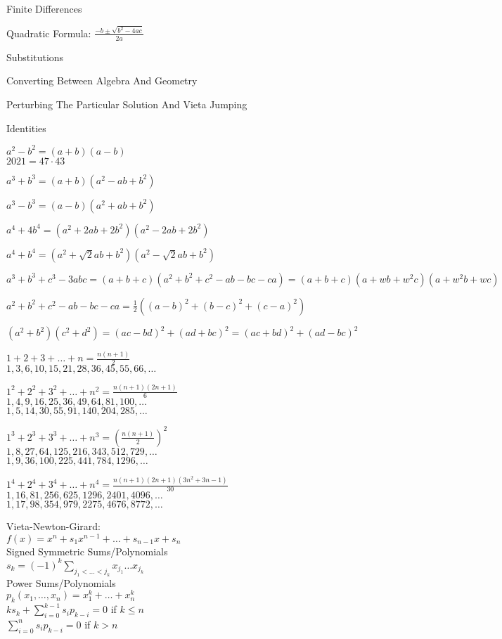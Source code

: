 Finite Differences

Quadratic Formula: $\frac{-b \pm \sqrt{b^2-4ac}}{2a}$

Substitutions

Converting Between Algebra And Geometry

Perturbing The Particular Solution And Vieta Jumping

Identities

$a^2-b^2=(a+b)(a-b)$ \\
$2021=47 \cdot 43$

$a^3+b^3=(a+b)(a^2-ab+b^2)$

$a^3-b^3=(a-b)(a^2+ab+b^2)$

$a^4+4b^4=(a^2+2ab+2b^2)(a^2-2ab+2b^2)$

$a^4+b^4=(a^2+\sqrt{2}ab+b^2)(a^2-\sqrt{2}ab+b^2)$

$a^3+b^3+c^3-3abc=(a+b+c)(a^2+b^2+c^2-ab-bc-ca)=(a+b+c)(a+wb+w^2c)(a+w^2b+wc)$

$a^2+b^2+c^2-ab-bc-ca=\frac{1}{2}((a-b)^2+(b-c)^2+(c-a)^2)$

$(a^2+b^2)(c^2+d^2)=(ac-bd)^2+(ad+bc)^2=(ac+bd)^2+(ad-bc)^2$

$1+2+3+\dots+n = \frac{n(n+1)}{2}$ \\
$1,3,6,10,15,21,28,36,45,55,66,\dots$

$1^2+2^2+3^2+\dots+n^2 = \frac{n(n+1)(2n+1)}{6}$ \\
$1,4,9,16,25,36,49,64,81,100,\dots$ \\
$1,5,14,30,55,91,140,204,285,\dots$

$1^3+2^3+3^3+\dots+n^3 = \left( \frac{n(n+1)}{2} \right)^2$ \\
$1,8,27,64,125,216,343,512,729,\dots$ \\
$1,9,36,100,225,441,784,1296,\dots$

$1^4+2^4+3^4+\dots+n^4 = \frac{n(n+1)(2n+1)(3n^2+3n-1)}{30}$ \\
$1,16,81,256,625,1296,2401,4096,\dots$ \\
$1,17,98,354,979,2275,4676,8772,\dots$

Vieta-Newton-Girard: \\
$f(x)=x^n+s_1 x^{n-1}+\dots+s_{n-1} x+s_n$ \\
Signed Symmetric Sums/Polynomials \\
$s_k = (-1)^k \sum_{j_1 < \dots < j_k} x_{j_1} \dots x_{j_k}$ \\
Power Sums/Polynomials \\
$p_k (x_1,\dots,x_n)=x_1^k+\dots+x_n^k$ \\
$ks_k + \sum_{i=0}^{k-1} s_i p_{k-i} = 0$ if $k \le n$ \\
$\sum_{i=0}^n s_i p_{k-i} = 0$ if $k>n$

